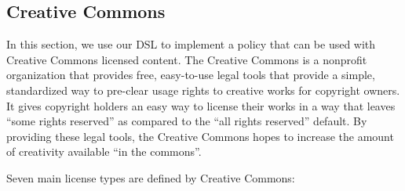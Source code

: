 \subsection{Creative Commons}\label{sec:model-cc}

In this section, we use our DSL to implement a policy that can be used with
Creative Commons licensed content.  The Creative Commons is a nonprofit
organization that provides free, easy-to-use legal tools that provide a simple,
standardized way to pre-clear usage rights to creative works for copyright
owners.  It gives copyright holders an easy way to license their works in a way
that leaves ``some rights reserved'' as compared to the ``all rights reserved''
default.  By providing these legal tools, the Creative Commons hopes to
increase the amount of creativity available ``in the commons''.

Seven main license types are defined by Creative Commons:

